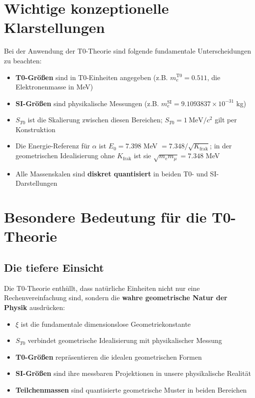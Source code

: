 	\section{Wichtige konzeptionelle Klarstellungen}
	
	Bei der Anwendung der T0-Theorie sind folgende fundamentale Unterscheidungen zu beachten:
	
	\begin{itemize}
		\item \textbf{T0-Größen} sind in T0-Einheiten angegeben (z.B. $m_e^{\mathrm{T0}} = 0.511$, die Elektronenmasse in MeV)
		\item \textbf{SI-Größen} sind physikalische Messungen (z.B. $m_e^{\mathrm{SI}} = 9.1093837\times 10^{-31}$ kg)
		\item \textbf{$S_{T0}$} ist die Skalierung zwischen diesen Bereichen; $S_{T0} = 1~\mathrm{MeV}/c^2$ gilt per Konstruktion
		\item Die Energie-Referenz für $\alpha$ ist $E_0 = 7.398$ MeV $= 7.348/\sqrt{K_{\text{frak}}}$; in der geometrischen Idealisierung ohne $K_{\text{frak}}$ ist sie $\sqrt{m_e m_\mu} = 7.348$ MeV
		\item Alle Massenskalen sind \textbf{diskret quantisiert} in beiden T0- und SI-Darstellungen
	\end{itemize}
	
	\section{Besondere Bedeutung für die T0-Theorie}
	
	\subsection{Die tiefere Einsicht}
	Die T0-Theorie enthüllt, dass natürliche Einheiten nicht nur eine Rechenvereinfachung sind, sondern die \textbf{wahre geometrische Natur der Physik} ausdrücken:
	\begin{itemize}
		\item \textbf{$\xi$} ist die fundamentale dimensionslose Geometriekonstante
		\item \textbf{$S_{T0}$} verbindet geometrische Idealisierung mit physikalischer Messung
		\item \textbf{T0-Größen} repräsentieren die idealen geometrischen Formen
		\item \textbf{SI-Größen} sind ihre messbaren Projektionen in unsere physikalische Realität
		\item \textbf{Teilchenmassen} sind quantisierte geometrische Muster in beiden Bereichen
	\end{itemize}
	
